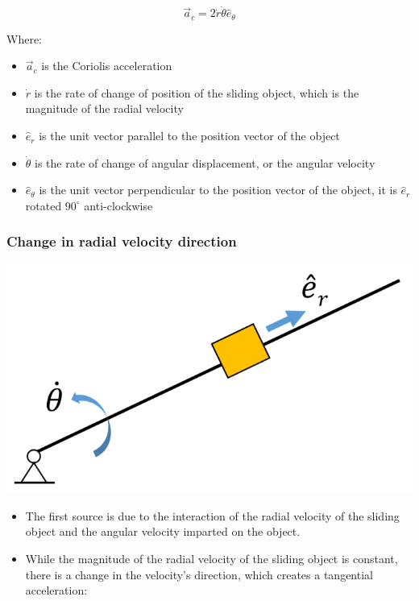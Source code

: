 \documentclass[11pt]{article}
\begin{document}
\[\vec{a}_c = 2 \dot{r} \dot{\theta} \hat{e}_{\theta}\]

Where:
\begin{itemize}
\item \(\vec{a}_c\) is the Coriolis acceleration
\item \(\dot{r}\) is the rate of change of position of the sliding object, which is the magnitude of the radial velocity
\item \(\hat{e}_r\) is the unit vector parallel to the position vector of the object
\item \(\dot{\theta}\) is the rate of change of angular displacement, or the angular velocity
\item \(\hat{e}_{\theta}\) is the unit vector perpendicular to the position vector of the object, it is \(\hat{e}_r\) rotated \(90^{\circ}\) anti-clockwise
\end{itemize}

 \newpage

\subsubsection{Change in radial velocity direction}
\label{sec:org9a68101}
\begin{center}
\includegraphics[width=.9\linewidth]{./images/change-in-radial-velocity-direction-coriolis-acceleration.png}
\end{center}
\begin{itemize}
\item The first source is due to the interaction of the radial velocity of the sliding object and the angular velocity imparted on the object.
\item While the magnitude of the radial velocity of the sliding object is constant, there is a change in the velocity's direction, which creates a tangential acceleration:
\end{itemize}
\end{document}
